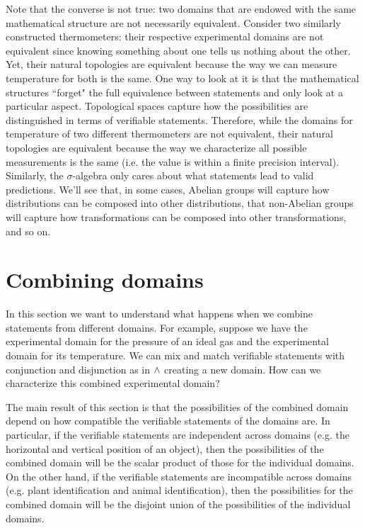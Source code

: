 \documentclass[11pt,letterpaper,fleqn]{memoir} %
\begin{document}
Note that the converse is not true: two domains that are endowed with the same mathematical structure are not necessarily equivalent. Consider two similarly constructed thermometers: their respective experimental domains are not equivalent since knowing something about one tells us nothing about the other. Yet, their natural topologies are equivalent because the way we can measure temperature for both is the same. One way to look at it is that the mathematical structures ``forget" the full equivalence between statements and only look at a particular aspect. Topological spaces capture how the possibilities are distinguished in terms of verifiable statements. Therefore, while the domains for temperature of two different thermometers are not equivalent, their natural topologies are equivalent because the way we characterize all possible measurements is the same (i.e. the value is within a finite precision interval). Similarly, the $\sigma$-algebra only cares about what statements lead to valid predictions. We'll see that, in some cases, Abelian groups will capture how distributions can be composed into other distributions, that non-Abelian groups will capture how transformations can be composed into other transformations, and so on.

\section{Combining domains}

In this section we want to understand what happens when we combine statements from different domains. For example, suppose we have the experimental domain for the pressure of an ideal gas and the experimental domain for its temperature. We can mix and match verifiable statements with conjunction and disjunction as in $\wedge$ creating a new domain. How can we characterize this combined experimental domain?

The main result of this section is that the possibilities of the combined domain depend on how compatible the verifiable statements of the domains are. In particular, if the verifiable statements are independent across domains (e.g. the horizontal and vertical position of an object), then the possibilities of the combined domain will be the scalar product of those for the individual domains. On the other hand, if the verifiable statements are incompatible across domains (e.g. plant identification and animal identification), then the possibilities for the combined domain will be the disjoint union of the possibilities of the individual domains.
\end{document}
